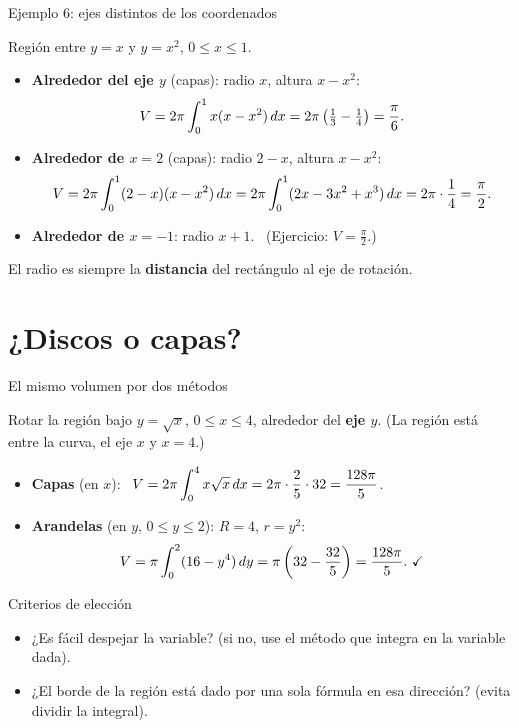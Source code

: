 \documentclass[10pt,aspectratio=169]{beamer}
\begin{document}
\begin{frame}{Ejemplo 6: ejes distintos de los coordenados}
  \begin{ejemplo}
    Región entre $y=x$ y $y=x^2$, $0\le x\le1$.
    \begin{itemize}
      \item \textbf{Alrededor del eje $y$} (capas): radio $x$, altura $x-x^2$:
        \[ V=2\pi\int_0^1x(x-x^2)\,dx=2\pi\left(\tfrac13-\tfrac14\right)=\frac\pi6. \]
      \item \textbf{Alrededor de $x=2$} (capas): radio $2-x$, altura $x-x^2$:
        \[ V=2\pi\int_0^1(2-x)(x-x^2)\,dx=2\pi\int_0^1(2x-3x^2+x^3)\,dx=2\pi\cdot\frac14=\frac\pi2. \]
      \item \textbf{Alrededor de $x=-1$}: radio $x+1$. \ (Ejercicio: $V=\frac{\pi}{2}$.)
    \end{itemize}
  \end{ejemplo}
  \begin{observacion}
    El radio es siempre la \textbf{distancia} del rectángulo al eje de rotación.
  \end{observacion}
\end{frame}

\section{¿Discos o capas?}

\begin{frame}{El mismo volumen por dos métodos}
  \begin{ejemplo}[7]
    Rotar la región bajo $y=\sqrt x$, $0\le x\le4$, alrededor del \textbf{eje $y$}. (La región está entre la curva, el eje $x$ y $x=4$.)
    \begin{itemize}
      \item \textbf{Capas} (en $x$): \ $V=2\pi\displaystyle\int_0^4x\sqrt x\,dx=2\pi\cdot\frac25\cdot32=\frac{128\pi}5$.
      \item \textbf{Arandelas} (en $y$, $0\le y\le2$): $R=4$, $r=y^2$:
        \[ V=\pi\int_0^2(16-y^4)\dy=\pi\left(32-\frac{32}5\right)=\frac{128\pi}5.\ \checkmark \]
    \end{itemize}
  \end{ejemplo}
  \begin{block}{Criterios de elección}
    \begin{itemize}
      \item ¿Es fácil despejar la variable? (si no, use el método que integra en la variable dada).
      \item ¿El borde de la región está dado por una sola fórmula en esa dirección? (evita dividir la integral).
    \end{itemize}
  \end{block}
\end{frame}
\end{document}
